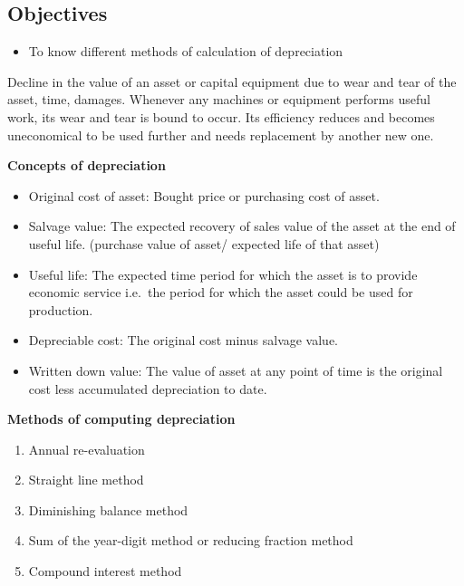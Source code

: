 \documentclass[
]{article}
\providecommand{\tightlist}{%
  \setlength{\itemsep}{0pt}\setlength{\parskip}{0pt}}
\begin{document}
\hypertarget{objectives-4}{%
\subsection*{Objectives}\label{objectives-4}}

\begin{itemize}
\tightlist
\item
  To know different methods of calculation of depreciation
\end{itemize}

Decline in the value of an asset or capital equipment due to wear and tear of the asset, time, damages. Whenever any machines or equipment performs useful work, its wear and tear is bound to occur. Its efficiency reduces and becomes uneconomical to be used further and needs replacement by another new one.

\textbf{Concepts of depreciation}

\begin{itemize}
\tightlist
\item
  Original cost of asset: Bought price or purchasing cost of asset.
\item
  Salvage value: The expected recovery of sales value of the asset at the end of useful life. (purchase value of asset/ expected life of that asset)
\item
  Useful life: The expected time period for which the asset is to provide economic service i.e.~the period for which the asset could be used for production.
\item
  Depreciable cost: The original cost minus salvage value.
\item
  Written down value: The value of asset at any point of time is the original cost less accumulated depreciation to date.
\end{itemize}

\textbf{Methods of computing depreciation}

\begin{enumerate}
\def\labelenumi{\arabic{enumi}.}
\tightlist
\item
  Annual re-evaluation
\item
  Straight line method
\item
  Diminishing balance method
\item
  Sum of the year-digit method or reducing fraction method
\item
  Compound interest method
\end{enumerate}
\end{document}
